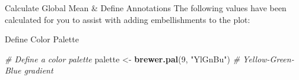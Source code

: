 \documentclass[
  ignorenonframetext,
]{beamer}
\newenvironment{Shaded}{\begin{snugshade}}{\end{snugshade}}
\newcommand{\CommentTok}[1]{\textcolor[rgb]{0.56,0.35,0.01}{\textit{#1}}}
\newcommand{\DecValTok}[1]{\textcolor[rgb]{0.00,0.00,0.81}{#1}}
\newcommand{\FunctionTok}[1]{\textcolor[rgb]{0.13,0.29,0.53}{\textbf{#1}}}
\newcommand{\NormalTok}[1]{#1}
\newcommand{\OtherTok}[1]{\textcolor[rgb]{0.56,0.35,0.01}{#1}}
\newcommand{\SpecialCharTok}[1]{\textcolor[rgb]{0.81,0.36,0.00}{\textbf{#1}}}
\newcommand{\StringTok}[1]{\textcolor[rgb]{0.31,0.60,0.02}{#1}}
\begin{document}
\begin{frame}[fragile]{Calculate Global Mean \& Define Annotations}
\label{calculate-global-mean-define-annotations}
The following values have been calculated for you to assist with adding
embellishments to the plot:


\begin{Shaded}
\end{Shaded}
\end{frame}

\begin{frame}[fragile]{Define Color Palette}
\label{define-color-palette}

\begin{Shaded}
\begin{Highlighting}[]
\CommentTok{\# Define a color palette}
\NormalTok{palette }\OtherTok{\textless{}{-}} \FunctionTok{brewer.pal}\NormalTok{(}\DecValTok{9}\NormalTok{, }\StringTok{"YlGnBu"}\NormalTok{)  }\CommentTok{\# Yellow{-}Green{-}Blue gradient}
\end{Highlighting}
\end{Shaded}
\end{frame}
\end{document}
